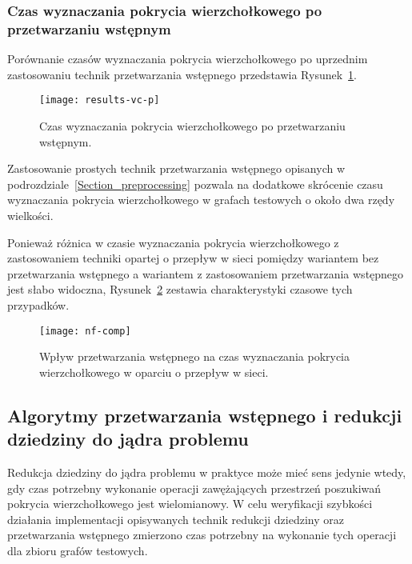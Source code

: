 \subsubsection{\textbf{Czas wyznaczania pokrycia wierzchołkowego po przetwarzaniu wstępnym}}
\par{
  Porównanie czasów wyznaczania pokrycia wierzchołkowego po uprzednim zastosowaniu technik przetwarzania wstępnego przedstawia Rysunek~\ref{fig_results_vc_p}.
  \begin{figure}
    \caption{Czas wyznaczania pokrycia wierzchołkowego po przetwarzaniu wstępnym.}
    \label{fig_results_vc_p}
    \centering
      \texttt{[image: results-vc-p]}
  \end{figure}
  Zastosowanie prostych technik przetwarzania wstępnego opisanych w podrozdziale~\ref{Section_preprocessing} pozwala na dodatkowe skrócenie czasu wyznaczania pokrycia wierzchołkowego w grafach testowych o około dwa rzędy wielkości.
}
\par{
  Ponieważ różnica w czasie wyznaczania pokrycia wierzchołkowego z zastosowaniem techniki opartej o przepływ w sieci pomiędzy wariantem bez przetwarzania wstępnego a wariantem z zastosowaniem przetwarzania wstępnego jest słabo widoczna, Rysunek~\ref{fig_nf_comp} zestawia charakterystyki czasowe tych przypadków.
  \begin{figure}
    \caption{Wpływ przetwarzania wstępnego na czas wyznaczania pokrycia wierzchołkowego w oparciu o przepływ w sieci.}
    \label{fig_nf_comp}
    \centering
      \texttt{[image: nf-comp]}
  \end{figure}
}
\subsection{Algorytmy przetwarzania wstępnego i redukcji dziedziny do jądra problemu}
\par{
  Redukcja dziedziny do jądra problemu w praktyce może mieć sens jedynie wtedy, gdy czas potrzebny wykonanie operacji zawężających przestrzeń poszukiwań pokrycia wierzchołkowego jest wielomianowy.
  W celu weryfikacji szybkości działania implementacji opisywanych technik redukcji dziedziny oraz przetwarzania wstępnego zmierzono czas potrzebny na wykonanie tych operacji dla zbioru grafów testowych. 
}
